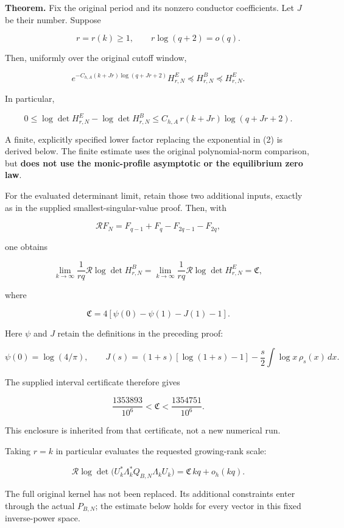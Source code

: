 \documentclass[11pt]{article}
\begin{document}
\textbf{Theorem.} Fix the original period and its nonzero conductor coefficients. Let \(J\) be their number. Suppose

\[
r=r(k)\ge1,\qquad r\log(q+2)=o(q).
\]

Then, uniformly over the original cutoff window,

\[
\boxed{
e^{-C_{h,A}(k+Jr)\log(q+Jr+2)}H^E_{r,N}
\preceq H^B_{r,N}\preceq H^E_{r,N}.
}
\tag{2}
\]

In particular,

\[
\boxed{
0\le
\log\det H^E_{r,N}-\log\det H^B_{r,N}
\le
C_{h,A}\,r(k+Jr)\log(q+Jr+2).
}
\tag{3}
\]

A finite, explicitly specified lower factor replacing the exponential in (2) is derived below. The finite estimate uses the original polynomial-norm comparison, but \textbf{does not use the monic-profile asymptotic or the equilibrium zero law}.

For the evaluated determinant limit, retain those two additional inputs, exactly as in the supplied smallest-singular-value proof. Then, with

\[
\mathcal R F_N=F_{q-1}+F_q-F_{2q-1}-F_{2q},
\]

one obtains

\[
\boxed{
\lim_{k\to\infty}\frac{1}{rq}\mathcal R\log\det H^B_{r,N}
=
\lim_{k\to\infty}\frac{1}{rq}\mathcal R\log\det H^E_{r,N}
=
\mathfrak C,
}
\tag{4}
\]

where

\[
\boxed{
\mathfrak C
=
4\left[\psi(0)-\psi(1)-J(1)-1\right].
}
\tag{5}
\]

Here \(\psi\) and \(J\) retain the definitions in the preceding proof:

\[
\psi(0)=\log(4/\pi),\qquad
J(s)=(1+s)[\log(1+s)-1]
-\frac{s}{2}\int\log x\,\rho_s(x)\,dx.
\]

The supplied interval certificate therefore gives

\[
\boxed{
\frac{1353893}{10^6}<\mathfrak C<
\frac{1354751}{10^6}.
}
\tag{6}
\]

This enclosure is inherited from that certificate, not a new numerical run.

Taking \(r=k\) in particular evaluates the requested growing-rank scale:

\[
\boxed{
\mathcal R\log\det
\bigl(U_k^*\Lambda_k^*Q_{B,N}\Lambda_kU_k\bigr)
=
\mathfrak C\,kq+o_h(kq).
}
\tag{7}
\]

The full original kernel has not been replaced. Its additional constraints enter through the actual \(P_{B,N}\); the estimate below holds for every vector in this fixed inverse-power space.
\end{document}

